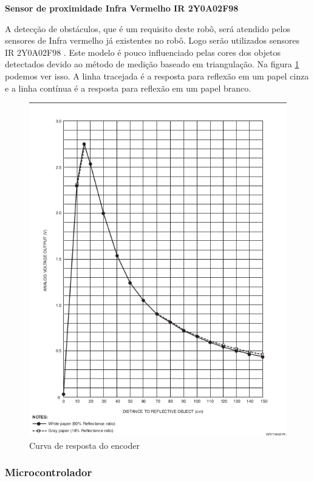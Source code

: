 \textbf{Sensor de proximidade Infra Vermelho IR 2Y0A02F98}

A detecção de obstáculos, que é um requisito deste robô, será atendido pelos sensores de Infra vermelho já existentes no robô. Logo serão utilizados sensores IR 2Y0A02F98 \cite{ir_sensor}. Este modelo é pouco influenciado pelas cores dos objetos detectados devido ao método de medição baseado em triangulação. Na figura \ref{fig:ir_sensor_response} podemos ver isso. A linha tracejada é a resposta para reflexão em um papel cinza e a linha contínua é a resposta para reflexão em um papel branco.

\begin{figure}[H]
\centering
\includegraphics[width=1\textwidth]{./figuras/ir-sensor-response.png}
\caption[Curva de resposta do encoder]{Curva de resposta do encoder}
\label{fig:ir_sensor_response}
\end{figure}

\subsubsection{Microcontrolador}

